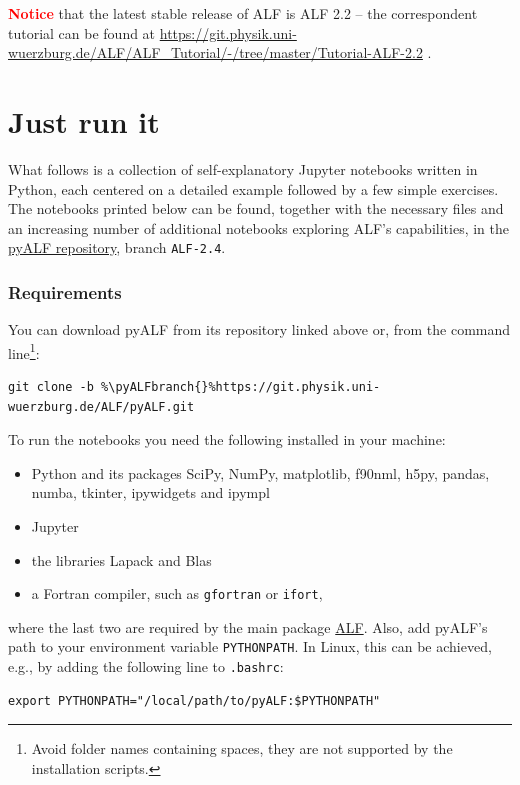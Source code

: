 \documentclass[10pt,modern]{scrartcl}
\numberwithin{exerciseitem}{exercise} %
\newcommand{\ALFbranch}{ALF-2.4}   %
\newcommand{\pyALFbranch}{ALF-2.4} %
\begin{document}
%
\textbf{\textcolor{red}{Notice}} that the latest stable release of ALF is ALF 2.2 -- the correspondent tutorial can be found at \href{https://git.physik.uni-wuerzburg.de/ALF/ALF_Tutorial/-/tree/master/Tutorial-ALF-2.2}{https://git.physik.uni-wuerzburg.de/ALF/ALF\_Tutorial/-/tree/master/Tutorial-ALF-2.2} .
%

\part{Just run it}

What follows is a collection of self-explanatory Jupyter notebooks written in Python, each centered on a detailed example followed by a few simple exercises. The notebooks printed below can be found, together with the necessary files and an increasing number of additional notebooks exploring ALF's capabilities, in the \href{https://git.physik.uni-wuerzburg.de/ALF/pyALF/-/tree/\pyALFbranch}{pyALF repository}, branch \texttt{\pyALFbranch{}}.


\section*{Requirements}

You can download pyALF from its repository linked above or, from the command line\footnote{Avoid folder names containing spaces, they are not supported by the installation scripts.}:
\begin{lstlisting}[style=bash,escapechar=\%]
git clone -b %\pyALFbranch{}%https://git.physik.uni-wuerzburg.de/ALF/pyALF.git
\end{lstlisting}
To run the notebooks you need the following installed in your machine:
\begin{itemize}
	\item Python and its packages SciPy, NumPy, matplotlib, f90nml, h5py, pandas, numba, tkinter, ipywidgets and ipympl
	\item Jupyter
	\item the libraries Lapack and Blas
	\item a Fortran compiler, such as \texttt{gfortran} or \texttt{ifort},
\end{itemize}
where the last two are required by the main package \href{https://git.physik.uni-wuerzburg.de/ALF/ALF/-/tree/\ALFbranch}{ALF}. %
Also, add pyALF's path to your environment variable \texttt{PYTHONPATH}. In Linux, this can be achieved, e.g., by adding the following line to \texttt{.bashrc}:
\begin{lstlisting}[style=bash]
export PYTHONPATH="/local/path/to/pyALF:$PYTHONPATH"
\end{lstlisting}
\end{document}
